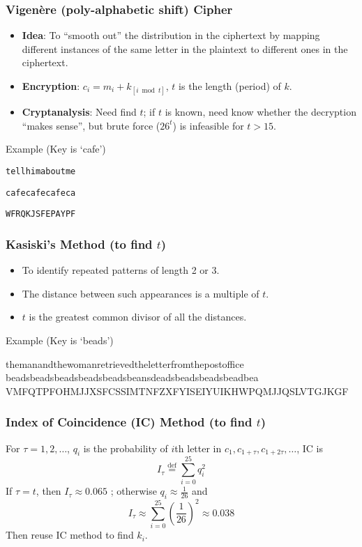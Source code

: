 \begin{frame}[fragile]\frametitle{Vigen\`{e}re (poly-alphabetic shift) Cipher}
\begin{itemize}
\item \textbf{Idea}: To ``smooth out'' the distribution in the ciphertext by mapping different instances of the same letter in the plaintext to different ones in the ciphertext. 
\item \textbf{Encryption}: $c_i=m_i+k_{[i\bmod t]}$, $t$ is the length (period) of $k$.
\item \textbf{Cryptanalysis}: Need find $t$; if $t$ is known, need know whether the decryption ``makes sense'', but brute force ($26^t$) is infeasible for $t > 15$.
\end{itemize}
\begin{exampleblock}{Example (Key is `cafe')}
\begin{description}[Ciphertext]
\item[Plaintext]  \verb|tellhimaboutme| \\
\item[Key]        \verb|cafecafecafeca| \\
\item[Ciphertext] \verb|WFRQKJSFEPAYPF|
\end{description}
\end{exampleblock}
\end{frame}
\begin{frame}[fragile]\frametitle{Kasiski's Method (to find $t$)}
\begin{itemize}
\item To identify repeated patterns of length 2 or 3.
\item The distance between such appearances is a multiple of $t$.
\item $t$ is the greatest common divisor of all the distances.
\end{itemize}
\begin{exampleblock}{Example (Key is `beads')}
\begin{semiverbatim}
themanandthewomanretrievedtheletterfromthepostoffice
beadsbeadsbeadsbeadsbeadsbeansdeadsbeadsbeadsbeadbea
VMFQTPFOH\alert{MJJ}XSFCSSIMTNFZXFYISEIYUIKHWPQ\alert{MJJ}QSLVTGJKGF
\end{semiverbatim}
\end{exampleblock}
\end{frame}
\begin{frame}\frametitle{Index of Coincidence (IC) Method (to find $t$)}
For $\tau = 1, 2, \dotsc$, $q_i$ is the probability of $i$th letter in $c_1, c_{1+\tau}, c_{1+2\tau}, \dotsc$, IC is
\[I_\tau \overset{\text{def}}{=}\sum_{i=0}^{25} q_i^2\]
\alert{If $\tau = t$, then $I_\tau \approx 0.065$} ; otherwise $q_i \approx \frac{1}{26}$ and
\[I_\tau \approx \sum_{i=0}^{25} \left(\frac{1}{26}\right)^2 \approx 0.038\]
Then reuse IC method to find $k_i$.
\end{frame}
